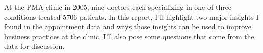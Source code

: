 At the PMA clinic in 2005, nine doctors each specializing in one of three conditions treated 5706 patients. In this report, I'll highlight two major insights I found in the appointment data and ways those insights can be used to improve business practices at the clinic. I'll also pose some questions that come from the data for discussion.
